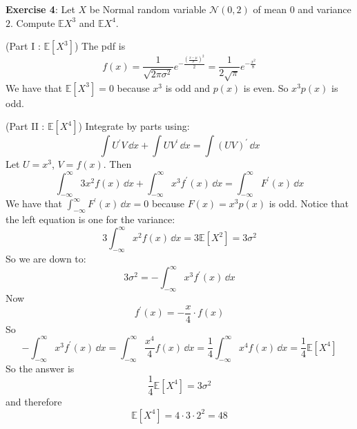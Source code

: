 \documentclass{article}
\begin{document}
\textbf{Exercise 4}: Let $X$ be Normal random variable $\mathcal{N}(0, 2)$ of mean $0$ and variance $2$. Compute $\mathbb{E}X^{3}$ and $\mathbb{E}X^{4}$.
    \begin{answer}
        (Part I : $\mathbb{E}[X^{3}]$) The pdf is 
            \begin{equation*}
                f(x) = \dfrac{1}{\sqrt{2\pi \sigma^{2}}} e^{-\frac{\left(\frac{x - \mu}{\sigma}\right)^{2}}{2}} = \dfrac{1}{2\sqrt{\pi}}e^{-\frac{x^{2}}{8}}
            \end{equation*}
        We have that $\mathbb{E}[X^{3}] = 0$ because $x^{3}$ is odd and $p(x)$ is even. So $x^{3}p(x)$ is odd.

        (Part II : $\mathbb{E}[X^{4}]$) Integrate by parts using:
            \begin{equation*}
                \int U^{\prime}V \, \dd{x} + \int UV^{\prime} \, \dd{x} = \int (UV)^{\prime} \, \dd{x} 
            \end{equation*}
        Let $U = x^{3}$, $V = f(x)$. Then
            \begin{equation*}
                \int_{-\infty}^{\infty} 3x^{2}f(x) \, \dd{x} + \int_{-\infty}^{\infty} x^{3}f^{\prime}(x) \, \dd{x} = \int_{-\infty}^{\infty} F^{\prime}(x) \, \dd{x} 
            \end{equation*}
        We have that $\int_{-\infty}^{\infty} F^{\prime}(x) \, \dd{x} = 0$ because $F(x) = x^{3}p(x)$ is odd. Notice that the left equation is one for the variance:
            \begin{equation*}
                3 \int_{-\infty}^{\infty} x^{2}f(x) \, \dd{x} = 3\mathbb{E}[X^{2}] = 3\sigma^{2}
            \end{equation*}
        So we are down to:
            \begin{equation*}
                3\sigma^{2} = -\int_{-\infty}^{\infty} x^{3}f^{\prime}(x) \, \dd{x} 
            \end{equation*}
        Now 
            \begin{equation*}
                f^{\prime}(x) = -\dfrac{x}{4} \cdot f(x)
            \end{equation*}
        So 
            \begin{equation*}
                -\int_{-\infty}^{\infty} x^{3}f^{\prime}(x) \, \dd{x} = \int_{-\infty}^{\infty} \dfrac{x^{4}}{4} f(x) \, \dd{x} = \dfrac{1}{4}\int_{-\infty}^{\infty} x^{4}f(x) \, \dd{x} = \dfrac{1}{4}\mathbb{E}[X^{4}]
            \end{equation*}
        So the answer is 
            \begin{equation*}
                \dfrac{1}{4} \mathbb{E}[X^{4}] = 3\sigma^{2}
            \end{equation*}
        and therefore
            \begin{equation*}
                \mathbb{E}[X^{4}] = 4 \cdot 3 \cdot 2^{2} = 48
            \end{equation*}
    \end{answer}
\end{document}
